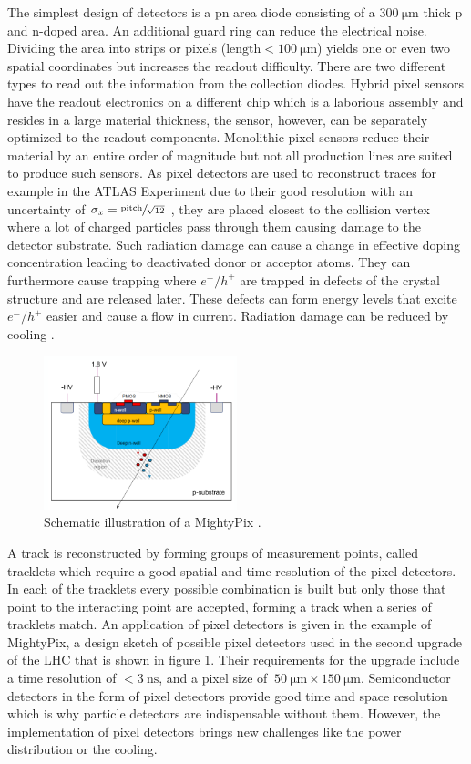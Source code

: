 The simplest design of detectors is a pn area diode consisting of a $\SI{300}{\micro\meter}$ thick p and n-doped area.
An additional guard ring can reduce the electrical noise.
Dividing the area into strips or pixels ($\text{length}<\SI{100}{\micro\meter}$) yields one or even two spatial coordinates but increases the readout difficulty.
There are two different types to read out the information from the collection diodes.
Hybrid pixel sensors have the readout electronics on a different chip which is a laborious assembly and resides in a large material thickness, the sensor, however, can be separately optimized to the readout components.
Monolithic pixel sensors reduce their material by an entire order of magnitude but not all production lines are suited to produce such sensors.
As pixel detectors are used to reconstruct traces for example in the ATLAS Experiment due to their good resolution with an uncertainty of $\sigma_x=\sfrac{\text{pitch}}{\sqrt{12}}$ \cite{Tom}, they are placed closest to the collision vertex where a lot of charged particles pass through them causing damage to the detector substrate.
Such radiation damage can cause a change in effective doping concentration leading to deactivated donor or acceptor atoms.
They can furthermore cause trapping where $e^-/h^+$ are trapped in defects of the crystal structure and are released later.
These defects can form energy levels that excite $e^-/h^+$ easier and cause a flow in current.
Radiation damage can be reduced by cooling \cite{Tom}.
\begin{figure}
    \centering
    \includegraphics[width=0.5\textwidth]{figs/MightyPix.png}
    \caption{Schematic illustration of a MightyPix \cite{MightyPix}.}
    \label{fig:MightyPix}
\end{figure}
A track is reconstructed by forming groups of measurement points, called tracklets which require a good spatial and time resolution of the pixel detectors.
In each of the tracklets every possible combination is built but only those that point to the interacting point are accepted, forming a track when a series of tracklets match.
An application of pixel detectors is given in the example of MightyPix, a design sketch of possible pixel detectors used in the second upgrade of the LHC that is shown in figure \ref{fig:MightyPix}.
Their requirements for the upgrade include a time resolution of $<\SI{3}{\nano\second}$, and a pixel size of $~\SI{50}{\micro\meter}\times\SI{150}{\micro\meter}$.
Semiconductor detectors in the form of pixel detectors provide good time and space resolution which is why particle detectors are indispensable without them.
However, the implementation of pixel detectors brings new challenges like the power distribution or the cooling. %
